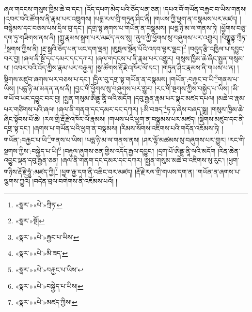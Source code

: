 ཞལ་གདངས་གསུས་ཁྱིམ་ཆེ་བ་དང་། །འོད་དཔག་མེད་པའི་ཅོད་པན་ཅན། །དཔའ་བོ་གཡོན་བརྐྱང་བ་ཡིས་གནས། །འབར་བའི་ཚོགས་ནི་རྣམ་པར་འཁྲུགས། །པདྨ་རལ་གྲི་གཏུན་ཤིང་ནི། །གཡས་ཀྱི་ཕྱག་ན་བསྣམས་པར་མཛད། །བསྙེམས་དང་བཅས་པས་དྲིལ་བུ་དང་། །དགྲ་སྟ་ཞགས་པ་གཡོན་ན་བསྣམས། །པདྨ་ཉི་མ་ལ་གནས་ཏེ། །ཕྱོགས་བཅུ་དག་ཏུ་གཟིགས་ནས་ནི། །ཀླུ་རྣམས་སྐྲག་པར་མཛད་ནས་སུ། །ནུབ་ཀྱི་ཕྱོགས་སུ་བཞུགས་པར་འགྱུར། །བིགྷྣཱནྟ་ཀྲྀཏ་\footnote{«སྣར་»«པེ་»ཀྲིཏ་}སྔགས་ཀྱིས་ནི། །རྔ་སྒྲའི་ཅོད་པན་ཡང་དག་ལྡན། །ཨུཏྤལ་སྔོན་པོའི་འདབ་ལྟར་ལྗང་།\footnote{«སྣར་»སྔོ།} །བདུད་རྩི་འཁྱིལ་པ་དབྱུང་བར་བྱ། །ཞལ་ནི་སྔོ་དང་དམར་དང་དཀར། །ཞལ་གདངས་པ་ནི་རྣམ་པར་འགྱུར། གསུས་ཁྱིམ་ཆེ་ཞིང་སྤྱན་གསུམ་པ། །འབར་བའི་འོད་ཀྱིས་རྣམ་པར་བརྒྱན། །སྣ་ཚོགས་རྡོ་རྗེ་འཁོར་ལོ་དང་། །གཏུན་ཤིང་རྣམས་ནི་གཡས་པ་ན། །སྡིགས་མཛུབ་ཞགས་པར་བཅས་པ་དང་། །དྲིལ་བུ་དགྲ་སྟ་གཡོན་ན་བསྣམས། །གཡོན་:བརྐྱང་བ་ཡི་\footnote{«སྣར་»«པེ་»རྐྱང་པ་ཡིས་}གནས་པ་ཡིས། །པདྨ་ཉི་མ་མནན་ནས་ནི། །བྱང་གི་ཕྱོགས་སུ་བཞུགས་པར་གྱུར། །རང་གི་སྔགས་ཀྱིས་བསྐྱེད་པ་ཡིས། །མི་གཡོ་བ་ཡང་དབྱུང་བར་བྱ། །སྤྱན་གསུམ་ཨིནྡྲ་ནཱི་ལའི་མདོག །དབུ་རྒྱན་རྣམ་པར་སྣང་མཛད་དཔལ། །མཆེ་བ་རྣམ་པར་གཙིགས་པའི་ཞལ། །ཞལ་ནི་གནག་དང་དམར་དང་དཀར། །:མི་བཟད་\footnote{«སྣར་»«པེ་»མི་ཟད་}ཧ་ཧ་ཞེས་བཞད་སྒྲ། །གསུས་ཁྱིམ་ཆེ་ཞིང་སྟོབས་པོ་ཆེ། །རལ་གྲི་རྡོ་རྗེ་འཁོར་ལོ་རྣམས། །གཡས་པའི་ཕྱག་ན་བསྣམས་པར་མཛད། །སྡིགས་མཛུབ་དང་ནི་དགྲ་སྟ་དང་། །ཞགས་པ་གཡོན་པའི་ཕྱག་ན་བསྣམས། །རིམས་སོགས་འཇིགས་པའི་གདོན་འཇོམས་ཏེ། །གཡོན་:བརྐྱང་པ་ཡི་\footnote{«སྣར་»«པེ་»བརྐྱང་པ་ཡིས་}གནས་པ་ཡིས། །པདྨ་ཉི་མ་ལ་གནས་ནས། །ཤར་ལྷོ་མཚམས་སུ་བཞུགས་པར་གྱུར། །རང་གི་སྔགས་ཀྱིས་:བསྐྱེད་པ་ཡི།\footnote{«སྣར་»«པེ་»བསྐྱེད་པ་ཡིས།} །བརྟུལ་ཞུགས་ཅན་གྱིས་འདོད་རྒྱལ་དབྱུང་། །དྲག་པོ་ཨིནྡྲ་ནཱི་ལའི་མདོག །རིན་ཆེན་འབྱུང་ལྡན་དབུ་རྒྱན་ཅན། །ཞལ་ནི་གནག་དང་དམར་དང་དཀར། །སྤྱན་གསུམ་མཆེ་བ་འཇིགས་སུ་རུང་། །ཕྱག་གཉིས་རྡོ་རྗེ་ཧཱུཾ་:མཛད་ཀྱི།\footnote{«སྣར་»«པེ་»མཛད་ཀྱིས།} །ཕྱག་རྒྱ་དག་ནི་འཆིང་བར་མཛད། །རྡོ་རྗེ་རལ་གྲི་གཡས་དག་ན། །གཡོན་ན་ཞགས་པ་ལྕགས་ཀྱུའོ། །བདེན་བྲལ་བགེགས་ནི་འཇོམས་པའོ། །
